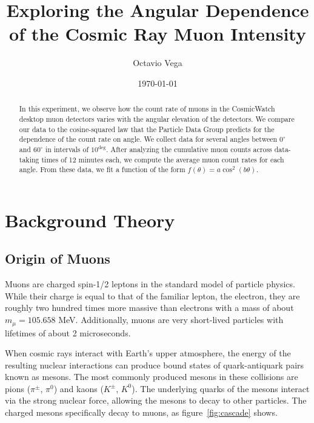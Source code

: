 \documentclass[aps,twocolumn,secnumarabic,balancelastpage,amsmath,amssymb,nofootinbib, floatfix]{revtex4-2}
\begin{document}
	\title{Exploring the Angular Dependence of the Cosmic Ray Muon Intensity}
	\author{Octavio Vega}
	\date{\today}
	
	\begin{abstract}
	In this experiment, we observe how the count rate of muons in the CosmicWatch desktop muon detectors varies with the angular elevation of the detectors. We compare our data to the cosine-squared law that the Particle Data Group predicts for the dependence of the count rate on angle. We collect data for several angles between $0^{\circ}$ and $60^{\circ}$ in intervals of $10^{\deg}$. After analyzing the cumulative muon counts across data-taking times of 12 minutes each, we compute the average muon count rates for each angle. From these data, we fit a function of the form $f(\theta)=a\cos^{2}(b\theta)$.
	\end{abstract}
	
	\maketitle
	
	
	\section{Background Theory}
	
	\subsection{Origin of Muons}
	Muons are charged spin-1/2 leptons in the standard model of particle physics. While their charge is equal to that of the familiar lepton, the electron, they are roughly two hundred times more massive than electrons with a mass of about $m_{\mu}=105.658$ MeV. Additionally, muons are very short-lived particles with lifetimes of about 2 microseconds. 
	
	When cosmic rays interact with Earth's upper atmosphere, the energy of the resulting nuclear interactions can produce bound states of quark-antiquark pairs known as mesons. The most commonly produced mesons in these collisions are pions ($\pi^{\pm}$, $\pi^{0}$) and kaons ($K^{\pm}$, $K^{0}$). The underlying quarks of the mesons interact via the strong nuclear force, allowing the mesons to decay to other particles. The charged mesons specifically decay to muons, as figure~\ref{fig:cascade} shows. 
	
\end{document}
